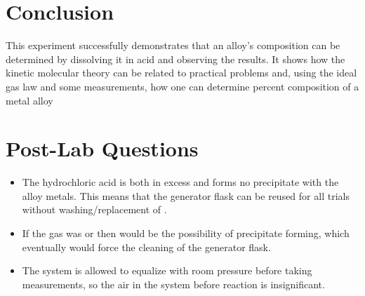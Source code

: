 \documentclass[11pt,letterpaper]{report}
\begin{document}
\section*{Conclusion}
This experiment successfully demonstrates that an alloy's composition can be determined by dissolving it in acid and observing the results. It shows how the kinetic molecular theory can be related to practical problems and, using the ideal gas law and some measurements, how one can determine percent composition of a metal alloy

\section*{Post-Lab Questions}
\begin{itemize}
\item The hydrochloric acid is both in excess and forms no precipitate with the alloy metals. This means that the generator flask can be reused for all trials without washing/replacement of . \\
\item If the gas was  or   then would be the possibility of precipitate forming, which eventually would force the cleaning of the generator flask. \\
\item The system is allowed to equalize with room pressure before taking measurements, so the air in the system before reaction is insignificant. \\
\end{itemize}
\end{document}
